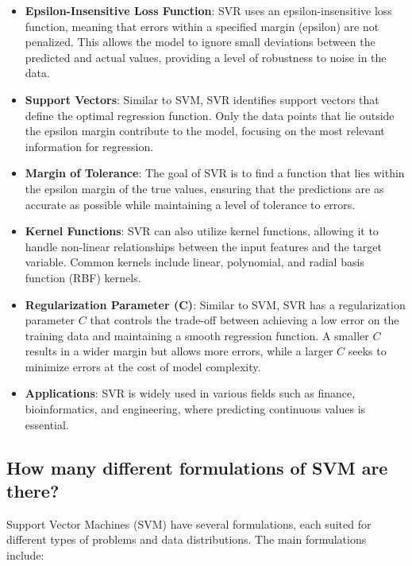 \begin{itemize}
    \item \textbf{Epsilon-Insensitive Loss Function}: SVR uses an epsilon-insensitive loss function, meaning that errors within a specified margin (epsilon) are not penalized. This allows the model to ignore small deviations between the predicted and actual values, providing a level of robustness to noise in the data.
    
    \item \textbf{Support Vectors}: Similar to SVM, SVR identifies support vectors that define the optimal regression function. Only the data points that lie outside the epsilon margin contribute to the model, focusing on the most relevant information for regression.

    \item \textbf{Margin of Tolerance}: The goal of SVR is to find a function that lies within the epsilon margin of the true values, ensuring that the predictions are as accurate as possible while maintaining a level of tolerance to errors.

    \item \textbf{Kernel Functions}: SVR can also utilize kernel functions, allowing it to handle non-linear relationships between the input features and the target variable. Common kernels include linear, polynomial, and radial basis function (RBF) kernels.

    \item \textbf{Regularization Parameter (C)}: Similar to SVM, SVR has a regularization parameter \(C\) that controls the trade-off between achieving a low error on the training data and maintaining a smooth regression function. A smaller \(C\) results in a wider margin but allows more errors, while a larger \(C\) seeks to minimize errors at the cost of model complexity.

    \item \textbf{Applications}: SVR is widely used in various fields such as finance, bioinformatics, and engineering, where predicting continuous values is essential.
\end{itemize}


\subsection{How many different formulations of SVM are there?}

Support Vector Machines (SVM) have several formulations, each suited for different types of problems and data distributions. The main formulations include:

